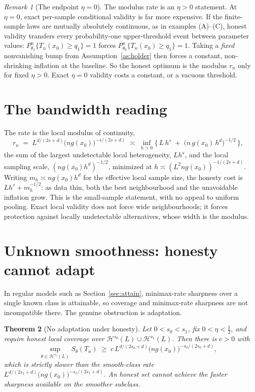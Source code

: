 \documentclass[11pt]{article}
\newtheorem{theorem}{Theorem}
\theoremstyle{definition}
\theoremstyle{remark}
\newtheorem{remark}[theorem]{Remark}
\newcommand{\Hs}[1][s]{\mathcal{H}^{#1}}
\begin{document}
\begin{remark}[The endpoint $\eta=0$]\label{rem:endpoint}
The modulus rate is an $\eta>0$ statement. At $\eta=0$, exact per-sample conditional
validity is far more expensive. If the finite-sample laws are mutually absolutely
continuous, as in examples (A)--(C), honest validity transfers every probability-one
upper-threshold event between parameter values: $P^n_{\theta_1}\{T_n(x_0)\ge q_1\}=1$ forces
$P^n_{\theta_0}\{T_n(x_0)\ge q_1\}=1$. Taking a \emph{fixed} nonvanishing bump from
Assumption~\ref{as:holder} then forces a constant, non-shrinking inflation at the baseline.
So the honest optimum is the modulus $r_n$ only for fixed $\eta>0$. Exact $\eta=0$ validity
costs a constant, or a vacuous threshold.
\end{remark}

\section{The bandwidth reading}

The rate is the local modulus of continuity,
\begin{equation}\label{eq:modulus}
  r_n \;=\; L^{d/(2s+d)}\big(n g(x_0)\big)^{-s/(2s+d)}
  \;\asymp\;
  \inf_{h>0}\Big\{\, L\,h^{s} \;+\; \big(n\,g(x_0)\,h^{d}\big)^{-1/2} \,\Big\} ,
\end{equation}
the sum of the largest undetectable local heterogeneity, $L h^{s}$, and the local sampling
scale, $(n g(x_0) h^{d})^{-1/2}$, minimized at $h \asymp (L^2 n g(x_0))^{-1/(2s+d)}$. Writing $m_h \asymp n g(x_0) h^{d}$ for the effective
local sample size, the honesty cost is $L h^{s} + m_h^{-1/2}$: as data thin, both the
best neighbourhood and the unavoidable inflation grow. This is the small-sample statement,
with no appeal to uniform pooling. Exact local validity does not force wide neighbourhoods;
it forces protection against locally undetectable alternatives, whose width is the modulus.

\section{Unknown smoothness: honesty cannot adapt}

In regular models such as Section~\ref{sec:attain}, minimax-rate sharpness over a single
known class is attainable, so coverage and minimax-rate sharpness are not incompatible
there. The genuine obstruction is adaptation.

\begin{theorem}[No adaptation under honesty]\label{thm:adapt}
Let $0 < s_0 < s_1$, fix $0<\eta<\tfrac12$, and require honest local coverage over
$\Hs[s_0](L) \cup \Hs[s_1](L)$. Then there is $c>0$ with
\begin{equation}\label{eq:adapt}
  \sup_{\theta \in \Hs[s_1](L)} S_\theta(T_n)
  \;\ge\; c\,L^{d/(2s_0+d)}\big(n g(x_0)\big)^{-s_0/(2s_0+d)} ,
\end{equation}
which is strictly slower than the smooth-class rate
$L^{d/(2s_1+d)}\big(n g(x_0)\big)^{-s_1/(2s_1+d)}$. An honest set cannot achieve the faster
sharpness available on the smoother subclass.
\end{theorem}
\end{document}
